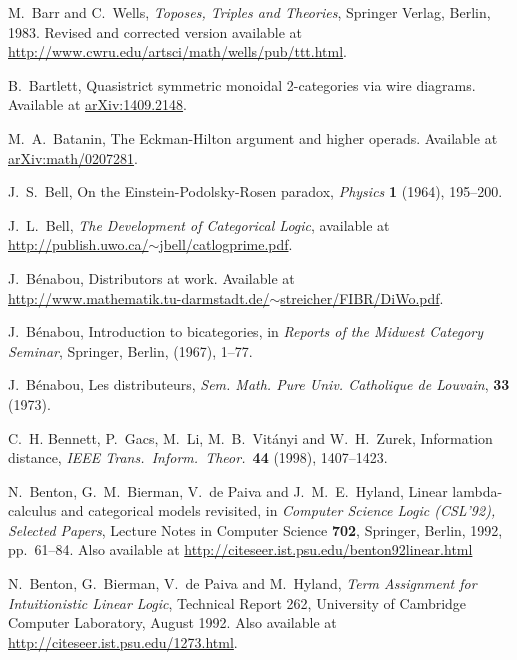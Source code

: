 \documentclass[12pt,twoside,openright]{report}
\begin{document}
\begin{thebibliography}{99}
 M.\ Barr and C.\ Wells, {\sl Toposes, Triples and Theories}, Springer Verlag, Berlin, 1983.  Revised and corrected version available at \href{http://www.cwru.edu/artsci/math/wells/pub/ttt.html}{
http://www.cwru.edu/artsci/math/wells/pub/ttt.html}.

 B.\ Bartlett, Quasistrict symmetric monoidal 2-categories via wire diagrams.  Available at \href{http://arxiv.org/abs/1409.2148}{arXiv:1409.2148}.

M.\ A.\ Batanin, The Eckman-Hilton argument and higher operads.  Available at
\href{http://arxiv.org/abs/math/0207281}{arXiv:math/0207281}.

 J.\ S.\ Bell, On the Einstein-Podolsky-Rosen paradox, {\sl Physics} {\bf 1} (1964), 195--200.

 J.\ L.\ Bell, {\sl The Development of Categorical Logic}, available at \hfill \break
\href{http://publish.uwo.ca/~jbell/catlogprime.pdf}{http://publish.uwo.ca/$\sim$jbell/catlogprime.pdf}.

 J.\ B{\'e}nabou, Distributors at work. Available at \\
\href{http://www.mathematik.tu-darmstadt.de/~streicher/FIBR/DiWo.pdf}{http://www.mathematik.tu-darmstadt.de/$\sim$streicher/FIBR/DiWo.pdf}.

 J.\ B{\'e}nabou, Introduction to bicategories, in \textsl{Reports of the Midwest Category Seminar}, Springer, Berlin, (1967), 1--77.

 J.\ B{\'e}nabou, Les distributeurs, \textsl{Sem. Math. Pure Univ. Catholique de Louvain}, \textbf{33} (1973).

 C.\ H. Bennett, P.\ Gacs, M.\ Li, M.\ B.\ Vit\'anyi and W.\ H.\ Zurek, Information distance, \textit{IEEE Trans.\ 
Inform.\ Theor.\ }\textbf{44} (1998), 1407--1423.

 N.\ Benton, G.\ M.\ Bierman, V.\ de Paiva and J.\ M.\ E.\
Hyland, Linear lambda-calculus and categorical models revisited, in
{\sl Computer Science Logic (CSL'92), Selected Papers}, Lecture Notes in Computer Science {\bf 702}, Springer, Berlin, 1992, pp.\ 61--84. Also available at
\href{http://citeseer.ist.psu.edu/benton92linear.html}
{http://citeseer.ist.psu.edu/benton92linear.html}

 N.\ Benton, G.\ Bierman, V.\ de Paiva and M.\ Hyland,
{\sl Term Assignment for Intuitionistic Linear Logic}, Technical Report 262, University of Cambridge Computer Laboratory, August 1992. Also available at \href{http://citeseer.ist.psu.edu/1273.html}
{http://citeseer.ist.psu.edu/1273.html}.


\end{thebibliography}
\end{document}
